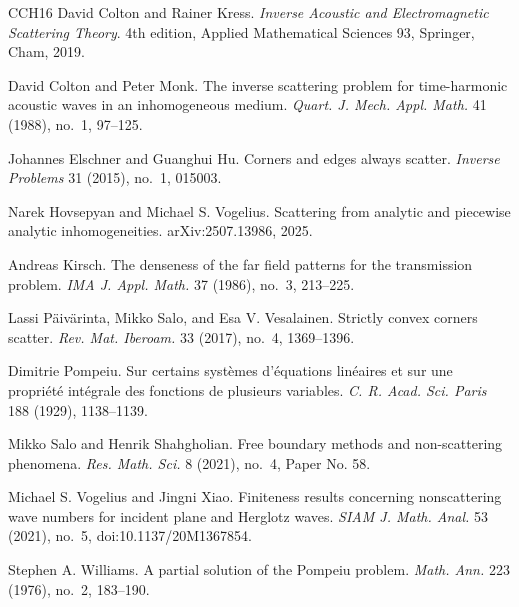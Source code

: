 \begin{thebibliography}{CCH16}
David Colton and Rainer Kress.
\newblock \emph{Inverse Acoustic and Electromagnetic Scattering Theory}.
\newblock 4th edition, Applied Mathematical Sciences 93, Springer, Cham, 2019.

David Colton and Peter Monk.
\newblock The inverse scattering problem for time-harmonic acoustic waves in
an inhomogeneous medium.
\newblock \emph{Quart. J. Mech. Appl. Math.} 41 (1988), no.~1, 97--125.

Johannes Elschner and Guanghui Hu.
\newblock Corners and edges always scatter.
\newblock \emph{Inverse Problems} 31 (2015), no.~1, 015003.

Narek Hovsepyan and Michael S. Vogelius.
\newblock Scattering from analytic and piecewise analytic inhomogeneities.
\newblock arXiv:2507.13986, 2025.

Andreas Kirsch.
\newblock The denseness of the far field patterns for the transmission problem.
\newblock \emph{IMA J. Appl. Math.} 37 (1986), no.~3, 213--225.

Lassi P{\"a}iv{\"a}rinta, Mikko Salo, and Esa V. Vesalainen.
\newblock Strictly convex corners scatter.
\newblock \emph{Rev. Mat. Iberoam.} 33 (2017), no.~4, 1369--1396.

Dimitrie Pompeiu.
\newblock Sur certains syst\`emes d'\'equations lin\'eaires et sur une
propri\'et\'e int\'egrale des fonctions de plusieurs variables.
\newblock \emph{C. R. Acad. Sci. Paris} 188 (1929), 1138--1139.

Mikko Salo and Henrik Shahgholian.
\newblock Free boundary methods and non-scattering phenomena.
\newblock \emph{Res. Math. Sci.} 8 (2021), no.~4, Paper No. 58.

Michael S. Vogelius and Jingni Xiao.
\newblock Finiteness results concerning nonscattering wave numbers for
incident plane and {Herglotz} waves.
\newblock \emph{SIAM J. Math. Anal.} 53 (2021), no.~5, doi:10.1137/20M1367854.

Stephen A. Williams.
\newblock A partial solution of the {Pompeiu} problem.
\newblock \emph{Math. Ann.} 223 (1976), no.~2, 183--190.

\end{thebibliography}
